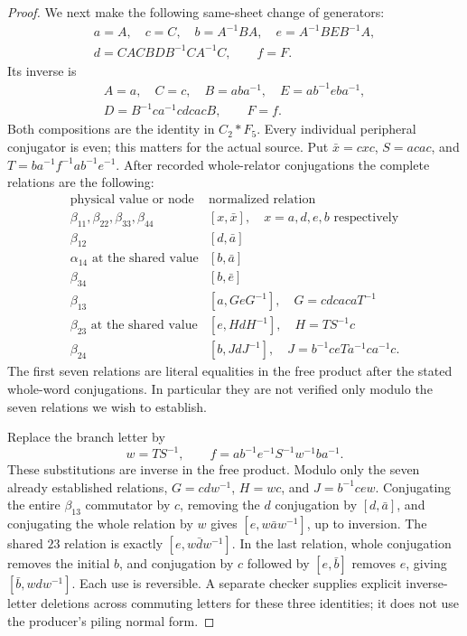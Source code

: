\begin{proof}
We next make the following same-sheet change of generators:
\begin{equation}\label{eq:B110-Nielsen}
 \begin{gathered}
 a=A,\quad c=C,\quad b=A^{-1}BA,\quad
 e=A^{-1}BEB^{-1}A,\\
 d=CACBD B^{-1}CA^{-1}C,\qquad f=F.
 \end{gathered}
\end{equation}
Its inverse is
\[
 \begin{gathered}
 A=a,\quad C=c,\quad B=aba^{-1},\quad E=ab^{-1}eba^{-1},\\
 D=B^{-1}ca^{-1}cdcacB,\qquad F=f.
 \end{gathered}
\]
Both compositions are the identity in $C_2*F_5$. Every individual
peripheral conjugator is even; this matters for the actual source.
Put $\bar x=cxc$, $S=acac$, and
$T=ba^{-1}f^{-1}ab^{-1}e^{-1}$. After recorded whole-relator
conjugations the complete relations are the following:
\begin{equation}\label{eq:B110-ten}
 \begin{array}{c|l}
 \text{physical value or node}&\text{normalized relation}\\\hline
 \beta_{11},\beta_{22},\beta_{33},\beta_{44}
   &[x,\bar x],\quad x=a,d,e,b\text{ respectively}\\
 \beta_{12}&[d,\bar a]\\
 \alpha_{14}\text{ at the shared value}&[b,\bar a]\\
 \beta_{34}&[b,\bar e]\\
 \beta_{13}&[a,G eG^{-1}],\quad G=cdcac aT^{-1}\\
 \beta_{23}\text{ at the shared value}&[e,HdH^{-1}],\quad H=TS^{-1}c\\
 \beta_{24}&[b,JdJ^{-1}],\quad J=b^{-1}ceTa^{-1}ca^{-1}c.
 \end{array}
\end{equation}
The first seven relations are literal equalities in the free product
after the stated whole-word conjugations. In particular they are not
verified only modulo the seven relations we wish to establish.

Replace the branch letter by
\begin{equation}\label{eq:B110-w}
 w=TS^{-1},\qquad f=ab^{-1}e^{-1}S^{-1}w^{-1}ba^{-1}.
\end{equation}
These substitutions are inverse in the free product. Modulo only
the seven already established relations, $G=cdw^{-1}$,
$H=wc$, and $J=b^{-1}cew$. Conjugating the entire $\beta_{13}$
commutator by $c$, removing the $d$ conjugation by $[d,\bar a]$,
and conjugating the whole relation by $w$ gives
$[e,w\bar a w^{-1}]$, up to inversion. The shared $23$ relation
is exactly $[e,w\bar d w^{-1}]$. In the last relation, whole
conjugation removes the initial $b$, and conjugation by $c$ followed
by $[e,\bar b]$ removes $e$, giving $[\bar b,wdw^{-1}]$.
Each use is reversible. A separate checker supplies explicit
inverse-letter deletions across commuting letters for these three
identities; it does not use the producer's piling normal form.


\end{proof}
